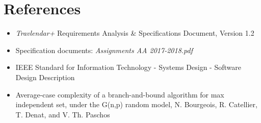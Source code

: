 \section{References}
\begin{itemize}
    \item \emph{Travlendar+} Requirements Analysis \& Specifications Document, Version 1.2
    \item Specification documents: \emph{Assignments AA 2017-2018.pdf}
    \item IEEE Standard for Information Technology - Systems Design - Software Design Description
    
    \item Average-case complexity of a branch-and-bound algorithm for max independent set, under the G(n,p) random model, 
N. Bourgeois, R. Catellier, T. Denat, and V. Th. Paschos
\end{itemize}